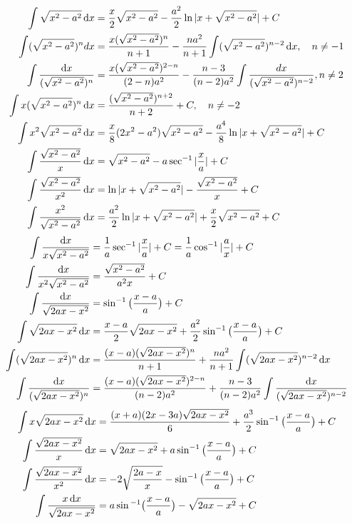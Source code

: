 \begin{align}
 \int\sqrt{x^{2}-a^{2}}\dif x&=\frac{x}{2}\sqrt{x^{2}-a^{2}}-\frac{a^{2}}{2}\ln|x+\sqrt{x^{2}-a^{2}}|+C\\
\int (\sqrt{x^{2}-a^{2}})^{n}dx&=\frac{x(\sqrt{x^{2}-a^{2}})^{n}}{n+1}-\frac{na^2}{n+1}\int(\sqrt{x^2-a^2})^{n-2}\dif x,\quad n\ne{-1}\\
 \int\frac{\dif x}{(\sqrt{x^{2}-a^{2}})^{n}}&=\frac{x(\sqrt{x^{2}-a^{2}})^{2-n}}{(2-n)a^{2}}-\frac{n-3}{(n-2)a^{2}}\int\frac{dx}{(\sqrt{x^{2}-a^{2}})^{n-2}},n\neq{2}\\
 \int x (\sqrt{x^{2}-a^{2}})^{n}\dif{x}&=\frac{(\sqrt{x^{2}-a^{2}})^{n+2}}{n+2}+C, \quad n\ne -2\\
\int x^{2}\sqrt{x^{2}-a^{2}}\dif{x}&=\frac{x}{8}(2x^{2}-a^{2})\sqrt{x^{2}-a^{2}}-\frac{a^{4}}{8}\ln|x+\sqrt{x^{2}-a^{2}}|+C\\
\int \frac{\sqrt{x^{2}-a^{2}}}{x}\dif{x}&=\sqrt{x^{2}-a^{2}}-a \sec^{-1}|\frac{x}{a}|+C \\
\int \frac{\sqrt{x^{2}-a^{2}}}{x^{2}}\dif{x}&=\ln |x+\sqrt{x^{2}-a^{2}}|-\frac{\sqrt{x^{2}-a^{2}}}{x}+C\\
\int\frac{x^{2}}{\sqrt{x^{2}-a^{2}}}\dif {x}&=\frac{a^{2}}{2}\ln|x+\sqrt{x^{2}-a^{2}}|+\frac{x}{2}\sqrt{x^{2}-a^{2}}+C
\end{align}
\begin{align} 
\int \frac{\dif{x}}{x\sqrt{x^{2}-a^{2}}}&=\frac{1}{a}\sec^{-1}|\frac{x}{a}|+C=\frac{1}{a}\cos^{-1}|\frac{a}{x}|+C\\
\int \frac{\dif{x}}{x^{2}\sqrt{x^{2}-a^{2}}}&=\frac{\sqrt{x^{2}-a^{2}}}{a^{2}x}+C\\
\int \frac{\dif{x}}{\sqrt{2ax-x^{2}}}&=\sin^{-1}\big(\frac{x-a}{a}\big)+C\\
\int \sqrt{2ax-x^{2}} \dif{x}&=\frac{x-a}{2}\sqrt{2ax-x^{2}}+\frac{a^{2}}{2}\sin^{-1}\big(\frac{x-a}{a} \big)+C\\
\int (\sqrt{2ax-x^{2}})^{n}\dif{x}&=\frac{(x-a)(\sqrt{2ax-x^{2}})^{n}}{n+1}+\frac{na^{2}}{n+1}\int (\sqrt{2ax-x^{2}})^{n-2}\dif{x}\\
 \int \frac{\dif{x}}{(\sqrt{2ax-x^{2}})^{n}}&=\frac{(x-a)(\sqrt{2ax-x^{2}})^{2-n}}{(n-2)a^{2}}+\frac{n-3}{(n-2)a^{2}}\int\frac{\dif{x}}{(\sqrt{2ax-x^{2}})^{n-2}} 
\end{align}
\begin{align} 
\int x \sqrt{2ax-x^2} \dif x &= \frac{(x+a)(2x-3a) \sqrt{2ax-x^2}}{6} + \frac{a^3}{2} \sin^{-1} \big( \frac{x-a}{a} \big) +C\\
\int\frac{\sqrt{2ax-x^2} }{x} \dif x&= \sqrt{2ax-x^2} + a \sin^{-1} \big( \frac{x-a}{a} \big) +C \\
\int\frac{\sqrt{2ax-x^2} }{x^2} \dif x&= -2 \sqrt{\frac{2a-x}{x} } - \sin^{-1} \big( \frac{x-a}{a} \big) +C \\
\int\frac{x \dif x}{\sqrt{2ax-x^2}} &= a \sin{^{-1}} \big( \frac{x-a}{a}  \big) - \sqrt{2ax-x^2} +C
\end{align}
